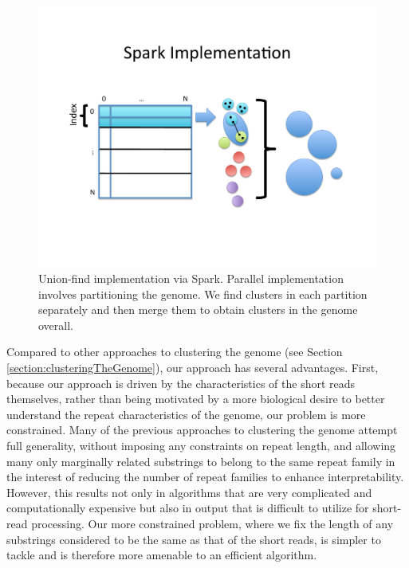 \documentclass[twocolumn,10pt]{article}
\begin{document}
\begin{figure}
\centering
\includegraphics[scale=0.6]{sparkUnionFind.pdf}
\caption{Union-find implementation via Spark.  Parallel implementation involves partitioning the genome.  We find clusters in each partition separately and then merge them to obtain clusters in the genome overall.}
\label{fig:sparkUnionFind}
\end{figure}

Compared to other approaches to clustering the genome (see Section \ref{section:clusteringTheGenome}), our approach has several advantages.  First, because our approach is driven by the characteristics of the short reads themselves, rather than being motivated by a more biological desire to better understand the repeat characteristics of the genome, our problem is more constrained.  Many of the previous approaches to clustering the genome attempt full generality, without imposing any constraints on repeat length, and allowing many only marginally related substrings to belong to the same repeat family in the interest of reducing the number of repeat families to enhance interpretability.  However, this results not only in algorithms that are very complicated and computationally expensive but also in output that is difficult to utilize for short-read processing.  Our more constrained problem, where we fix the length of any substrings considered to be the same as that of the short reads, is simpler to tackle and is therefore more amenable to an efficient algorithm.  
\end{document}
